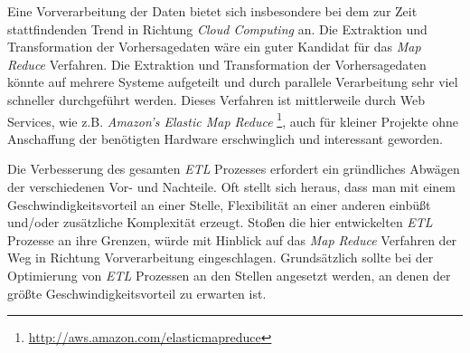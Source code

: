 Eine Vorverarbeitung der Daten bietet sich insbesondere bei dem zur
Zeit stattfindenden Trend in Richtung \textit{Cloud Computing} an. Die
Extraktion und Transformation der Vorhersagedaten wäre ein guter
Kandidat für das \textit{Map Reduce} Verfahren. Die Extraktion und
Transformation der Vorhersagedaten könnte auf mehrere Systeme
aufgeteilt und durch parallele Verarbeitung sehr viel schneller
durchgeführt werden.  Dieses Verfahren ist mittlerweile durch Web
Services, wie z.B. \textit{Amazon's Elastic Map Reduce}
\footnote{\url{http://aws.amazon.com/elasticmapreduce}}, auch für
kleiner Projekte ohne Anschaffung der benötigten Hardware
erschwinglich und interessant geworden.

Die Verbesserung des gesamten \textit{ETL} Prozesses erfordert ein
gründliches Abwägen der verschiedenen Vor- und Nachteile. Oft stellt
sich heraus, dass man mit einem Geschwindigkeitsvorteil an einer
Stelle, Flexibilität an einer anderen einbüßt und/oder zusätzliche
Komplexität erzeugt. Stoßen die hier entwickelten \textit{ETL}
Prozesse an ihre Grenzen, würde mit Hinblick auf das \textit{Map
  Reduce} Verfahren der Weg in Richtung Vorverarbeitung
eingeschlagen. Grundsätzlich sollte bei der Optimierung von
\textit{ETL} Prozessen an den Stellen angesetzt werden, an denen der
größte Geschwindigkeitsvorteil zu erwarten ist.

